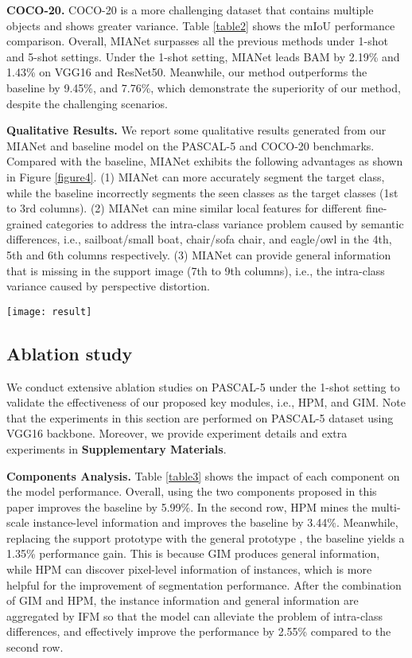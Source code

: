 \documentclass[10pt,twocolumn,letterpaper]{article}
\begin{document}
\noindent\textbf{COCO-20.} COCO-20 is a more challenging dataset that contains multiple objects and shows greater variance. Table \ref{table2} shows the mIoU performance comparison. Overall, MIANet surpasses all the previous methods under 1-shot and 5-shot settings. Under the 1-shot setting, MIANet leads BAM by 2.19\% and 1.43\% on VGG16 and ResNet50. Meanwhile, our method outperforms the baseline by 9.45\%, and 7.76\%, which demonstrate the superiority of our method, despite the challenging scenarios.\par


\noindent\textbf{Qualitative Results.} We report some qualitative results generated from our MIANet and baseline model on the PASCAL-5 and COCO-20 benchmarks. Compared with the baseline, MIANet exhibits the following advantages as shown in Figure \ref{figure4}. (1) MIANet can more accurately segment the target class, while the baseline incorrectly segments the seen classes as the target classes (1st to 3rd columns). (2) MIANet can mine similar local features for different fine-grained categories to address the intra-class variance problem caused by semantic differences, i.e., sailboat/small boat, chair/sofa chair, and eagle/owl in the 4th, 5th and 6th columns respectively. (3) MIANet can provide general information that is missing in the support image (7th to 9th columns), i.e., the intra-class variance caused by perspective distortion.
\begin{figure*}[htbp]
	\centering
	\texttt{[image: result]}
	\caption{Qualitative results of our method MIANet and baseline on PASCAL-5 and COCO-20 benchmarks. Zoom in for details.}
	\label{figure4}
\end{figure*}

\subsection{Ablation study}
We conduct extensive ablation studies on PASCAL-5 under the 1-shot setting to validate the effectiveness of our proposed key modules, i.e., HPM, and GIM. Note that the experiments in this section are performed on PASCAL-5 dataset using VGG16 backbone. Moreover, we provide experiment details and extra experiments in \textbf{Supplementary Materials}. \par
\noindent\textbf{Components Analysis.} Table \ref{table3} shows the impact of each component on the model performance. Overall, using the two components proposed in this paper improves the baseline by 5.99\%. In the second row, HPM mines the multi-scale instance-level information and improves the baseline by 3.44\%. Meanwhile, replacing the support prototype  with the general prototype , the baseline yields a 1.35\% performance gain. This is because GIM produces general information, while HPM can discover pixel-level information of instances, which is more helpful for the improvement of segmentation performance. After the combination of GIM and HPM, the instance information and general information are aggregated by IFM so that the model can alleviate the problem of intra-class differences, and effectively improve the performance by 2.55\% compared to the second row.\par
\end{document}

